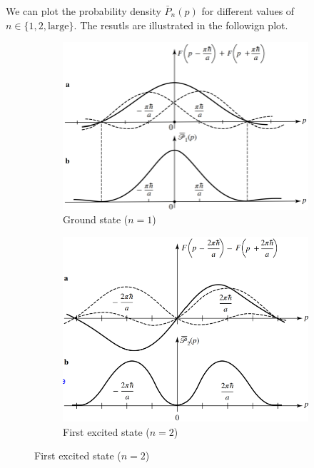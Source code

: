 We can plot the probability density $\bar{P}_n(p)$ for different values of $n\in\{1,2,\text{large}\}$. The resutls are illustrated in the followign plot.
\begin{figure}[h!]
    \centering
    \begin{subfigure}{.3\columnwidth}
        \centering
        \includegraphics[width=\columnwidth]{PartOne/ChapterTwo/infinitewell_groundstate.png}
        \caption{Ground state ($n=1$)}
    \end{subfigure}
    \hfill
    \begin{subfigure}{.3\columnwidth}
        \centering
        \includegraphics[width=\columnwidth]{PartOne/ChapterTwo/infinitewell_firstexcitedstate.png}
        \caption{First excited state ($n=2$)}
    \end{subfigure}

\end{figure}
